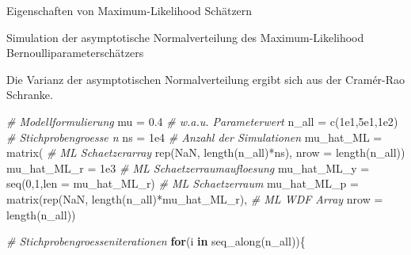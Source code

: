 \documentclass[
  8pt,
  ignorenonframetext,
]{beamer}
\newenvironment{Shaded}{\begin{snugshade}}{\end{snugshade}}
\newcommand{\AttributeTok}[1]{\textcolor[rgb]{0.77,0.63,0.00}{#1}}
\newcommand{\CommentTok}[1]{\textcolor[rgb]{0.56,0.35,0.01}{\textit{#1}}}
\newcommand{\ConstantTok}[1]{\textcolor[rgb]{0.00,0.00,0.00}{#1}}
\newcommand{\ControlFlowTok}[1]{\textcolor[rgb]{0.13,0.29,0.53}{\textbf{#1}}}
\newcommand{\DecValTok}[1]{\textcolor[rgb]{0.00,0.00,0.81}{#1}}
\newcommand{\FloatTok}[1]{\textcolor[rgb]{0.00,0.00,0.81}{#1}}
\newcommand{\FunctionTok}[1]{\textcolor[rgb]{0.00,0.00,0.00}{#1}}
\newcommand{\NormalTok}[1]{#1}
\newcommand{\OtherTok}[1]{\textcolor[rgb]{0.56,0.35,0.01}{#1}}
\newcommand{\SpecialCharTok}[1]{\textcolor[rgb]{0.00,0.00,0.00}{#1}}
\begin{document}
\begin{frame}[fragile]{Eigenschaften von Maximum-Likelihood Schätzern}
\protect\hypertarget{eigenschaften-von-maximum-likelihood-schuxe4tzern-1}{}
\small

Simulation der asymptotische Normalverteilung des Maximum-Likelihood
Bernoulliparameterschätzers

\footnotesize

Die Varianz der asymptotischen Normalverteilung ergibt sich aus der
Cramér-Rao Schranke.

\vspace{1mm}

\begin{Shaded}
\begin{Highlighting}[]
\CommentTok{\# Modellformulierung}
\NormalTok{mu          }\OtherTok{=} \FloatTok{0.4}                                           \CommentTok{\# w.a.u. Parameterwert}
\NormalTok{n\_all       }\OtherTok{=} \FunctionTok{c}\NormalTok{(}\FloatTok{1e1}\NormalTok{,}\FloatTok{5e1}\NormalTok{,}\FloatTok{1e2}\NormalTok{)                                }\CommentTok{\# Stichprobengroesse n}
\NormalTok{ns          }\OtherTok{=} \FloatTok{1e4}                                           \CommentTok{\# Anzahl der Simulationen}
\NormalTok{mu\_hat\_ML   }\OtherTok{=} \FunctionTok{matrix}\NormalTok{(                                       }\CommentTok{\# ML Schaetzerarray}
                        \FunctionTok{rep}\NormalTok{(}\ConstantTok{NaN}\NormalTok{,}
                        \FunctionTok{length}\NormalTok{(n\_all)}\SpecialCharTok{*}\NormalTok{ns),}
                        \AttributeTok{nrow =} \FunctionTok{length}\NormalTok{(n\_all))}
\NormalTok{mu\_hat\_ML\_r }\OtherTok{=} \FloatTok{1e3}                                           \CommentTok{\# ML Schaetzerraumaufloesung}
\NormalTok{mu\_hat\_ML\_y }\OtherTok{=} \FunctionTok{seq}\NormalTok{(}\DecValTok{0}\NormalTok{,}\DecValTok{1}\NormalTok{,}\AttributeTok{len =}\NormalTok{ mu\_hat\_ML\_r)                    }\CommentTok{\# ML Schaetzerraum}
\NormalTok{mu\_hat\_ML\_p }\OtherTok{=} \FunctionTok{matrix}\NormalTok{(}\FunctionTok{rep}\NormalTok{(}\ConstantTok{NaN}\NormalTok{, }\FunctionTok{length}\NormalTok{(n\_all)}\SpecialCharTok{*}\NormalTok{mu\_hat\_ML\_r),   }\CommentTok{\# ML WDF Array}
                     \AttributeTok{nrow =} \FunctionTok{length}\NormalTok{(n\_all))}

\CommentTok{\# Stichprobengroesseniterationen}
\ControlFlowTok{for}\NormalTok{(i }\ControlFlowTok{in} \FunctionTok{seq\_along}\NormalTok{(n\_all))\{}


\end{Highlighting}
\end{Shaded}
\end{frame}
\end{document}
